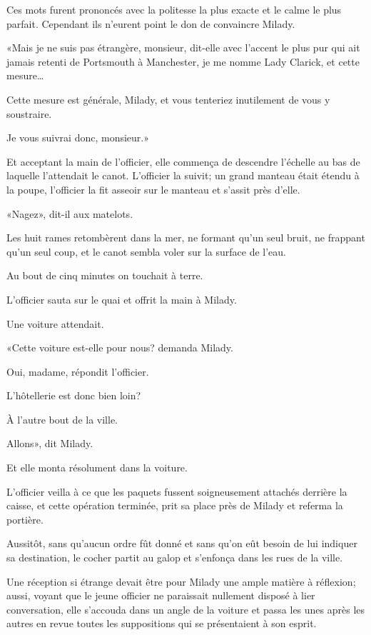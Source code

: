 Ces mots furent prononcés avec la politesse la plus exacte et le calme le plus parfait. Cependant ils n'eurent point le don de convaincre Milady. 

«Mais je ne suis pas étrangère, monsieur, dit-elle avec l'accent le plus pur qui ait jamais retenti de Portsmouth à Manchester, je me nomme Lady Clarick, et cette mesure\dots 

\speak  Cette mesure est générale, Milady, et vous tenteriez inutilement de vous y soustraire. 

\speak  Je vous suivrai donc, monsieur.» 

Et acceptant la main de l'officier, elle commença de descendre l'échelle au bas de laquelle l'attendait le canot. L'officier la suivit; un grand manteau était étendu à la poupe, l'officier la fit asseoir sur le manteau et s'assit près d'elle. 

«Nagez», dit-il aux matelots. 

Les huit rames retombèrent dans la mer, ne formant qu'un seul bruit, ne frappant qu'un seul coup, et le canot sembla voler sur la surface de l'eau. 

Au bout de cinq minutes on touchait à terre. 

L'officier sauta sur le quai et offrit la main à Milady. 

Une voiture attendait. 

«Cette voiture est-elle pour nous? demanda Milady. 

\speak  Oui, madame, répondit l'officier. 

\speak  L'hôtellerie est donc bien loin? 

\speak  À l'autre bout de la ville. 

\speak  Allons», dit Milady. 

Et elle monta résolument dans la voiture. 

L'officier veilla à ce que les paquets fussent soigneusement attachés derrière la caisse, et cette opération terminée, prit sa place près de Milady et referma la portière. 

Aussitôt, sans qu'aucun ordre fût donné et sans qu'on eût besoin de lui indiquer sa destination, le cocher partit au galop et s'enfonça dans les rues de la ville. 

Une réception si étrange devait être pour Milady une ample matière à réflexion; aussi, voyant que le jeune officier ne paraissait nullement disposé à lier conversation, elle s'accouda dans un angle de la voiture et passa les unes après les autres en revue toutes les suppositions qui se présentaient à son esprit. 

